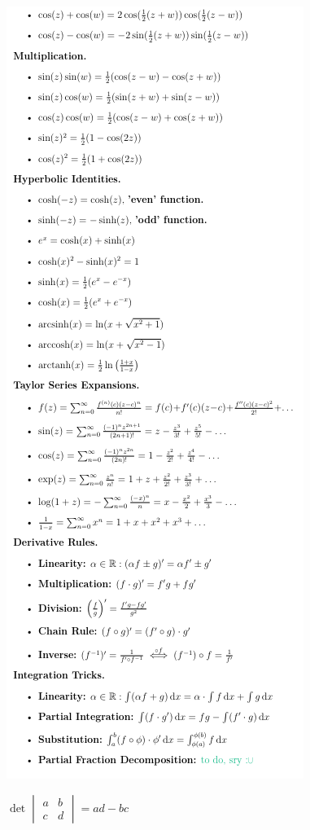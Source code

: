 \documentclass[8pt]{article}
\begin{document}
\begin{multicols*}{3}
\begin{minipage}{\linewidth-2cm}
    \end{minipage}
    \columnbreak
    \newpage
    $\;$ \\
    $\;$ \\
    \begin{minipage}{\linewidth-2cm}
      \includegraphics[width=\linewidth]{./media/Useful_Integrals_and_Identities_2.png}
    \end{minipage}
  \(\det\begin{vmatrix}a & b \\ c & d\end{vmatrix} = ad-bc\)
\end{multicols*}
\end{document}
